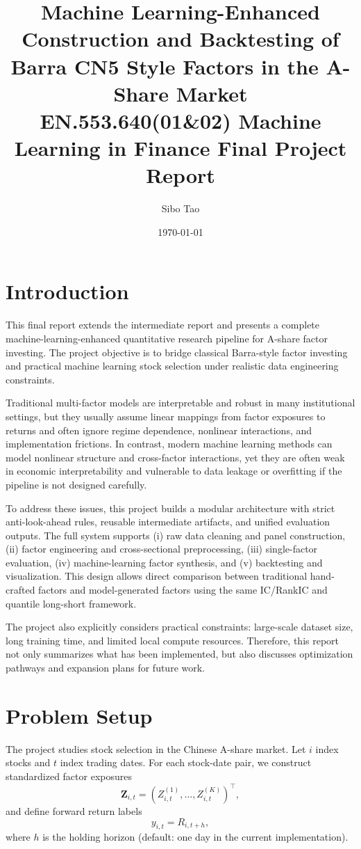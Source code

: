 \documentclass[letterpaper,11pt]{article}
\title{Machine Learning-Enhanced Construction and Backtesting of Barra CN5 Style Factors in the A-Share Market
\\ {\small EN.553.640(01\&02) Machine Learning in Finance Final Project Report}}
\author{
Sibo Tao
}
\date{\today}
\begin{document}
\maketitle

\section{Introduction}
This final report extends the intermediate report and presents a complete machine-learning-enhanced quantitative research pipeline for A-share factor investing. The project objective is to bridge classical Barra-style factor investing and practical machine learning stock selection under realistic data engineering constraints.

Traditional multi-factor models are interpretable and robust in many institutional settings, but they usually assume linear mappings from factor exposures to returns and often ignore regime dependence, nonlinear interactions, and implementation frictions. In contrast, modern machine learning methods can model nonlinear structure and cross-factor interactions, yet they are often weak in economic interpretability and vulnerable to data leakage or overfitting if the pipeline is not designed carefully.

To address these issues, this project builds a modular architecture with strict anti-look-ahead rules, reusable intermediate artifacts, and unified evaluation outputs. The full system supports (i) raw data cleaning and panel construction, (ii) factor engineering and cross-sectional preprocessing, (iii) single-factor evaluation, (iv) machine-learning factor synthesis, and (v) backtesting and visualization. This design allows direct comparison between traditional hand-crafted factors and model-generated factors using the same IC/RankIC and quantile long-short framework.

The project also explicitly considers practical constraints: large-scale dataset size, long training time, and limited local compute resources. Therefore, this report not only summarizes what has been implemented, but also discusses optimization pathways and expansion plans for future work.

\section{Problem Setup}
The project studies stock selection in the Chinese A-share market. Let $i$ index stocks and $t$ index trading dates. For each stock-date pair, we construct standardized factor exposures
\begin{equation}
\mathbf{Z}_{i,t} = (Z_{i,t}^{(1)},\ldots,Z_{i,t}^{(K)})^\top,
\end{equation}
and define forward return labels
\begin{equation}
y_{i,t}=R_{i,t+h},
\end{equation}
where $h$ is the holding horizon (default: one day in the current implementation).
\end{document}
